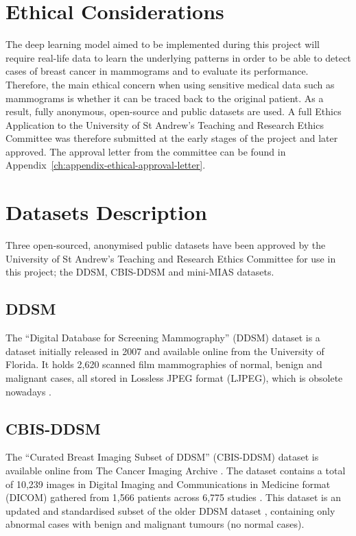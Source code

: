 \section{Ethical Considerations}

The deep learning model aimed to be implemented during this project will require real-life data to learn the underlying patterns in order to be able to detect cases of breast cancer in mammograms and to evaluate its performance. Therefore, the main ethical concern when using sensitive medical data such as  mammograms is whether it can be traced back to the original patient. As a result, fully anonymous, open-source and public datasets are used. A full Ethics Application to the University of St Andrew's Teaching and Research Ethics Committee was therefore submitted at the early stages of the project and later approved. The approval letter from the committee can be found in Appendix~\ref{ch:appendix-ethical-approval-letter}.


\section{Datasets Description}

Three open-sourced, anonymised public datasets have been approved by the University of St Andrew's Teaching and Research Ethics Committee for use in this project; the DDSM, CBIS-DDSM and mini-MIAS datasets.

\subsection{DDSM}

The ``Digital Database for Screening Mammography'' (DDSM) dataset is a dataset initially released in 2007 and available online from the University of Florida. It holds 2,620 scanned film mammographies of normal, benign and malignant cases, all stored in Lossless JPEG format (LJPEG), which is obsolete nowadays \citep{DDSMdataset2001}.

\subsection{CBIS-DDSM}
\label{sec:ethics-datasets-cbisddsm}

The ``Curated Breast Imaging Subset of DDSM'' (CBIS-DDSM) dataset \citep{Lee2017} is available online from The Cancer Imaging Archive \citep{Clark2013}. The dataset contains a total of 10,239 images in Digital Imaging and Communications in Medicine format (DICOM) gathered from 1,566 patients across 6,775 studies \citep{Lee2017}. This dataset is an updated and standardised subset of the older DDSM dataset \citep{DDSMdataset2001}, containing only abnormal cases with benign and malignant tumours (no normal cases).

